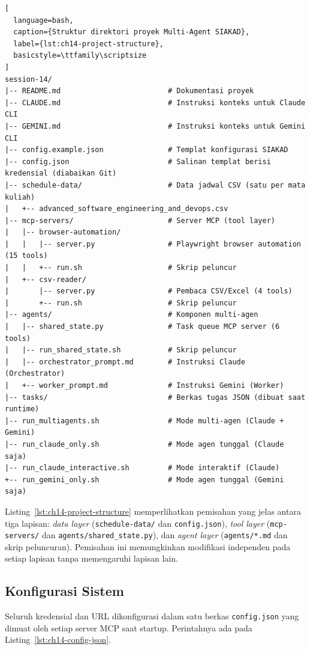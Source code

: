 \begin{lstlisting}[
  language=bash,
  caption={Struktur direktori proyek Multi-Agent SIAKAD},
  label={lst:ch14-project-structure},
  basicstyle=\ttfamily\scriptsize
]
session-14/
|-- README.md                         # Dokumentasi proyek
|-- CLAUDE.md                         # Instruksi konteks untuk Claude CLI
|-- GEMINI.md                         # Instruksi konteks untuk Gemini CLI
|-- config.example.json               # Templat konfigurasi SIAKAD
|-- config.json                       # Salinan templat berisi kredensial (diabaikan Git)
|-- schedule-data/                    # Data jadwal CSV (satu per mata kuliah)
|   +-- advanced_software_engineering_and_devops.csv
|-- mcp-servers/                      # Server MCP (tool layer)
|   |-- browser-automation/
|   |   |-- server.py                 # Playwright browser automation (15 tools)
|   |   +-- run.sh                    # Skrip peluncur
|   +-- csv-reader/
|       |-- server.py                 # Pembaca CSV/Excel (4 tools)
|       +-- run.sh                    # Skrip peluncur
|-- agents/                           # Komponen multi-agen
|   |-- shared_state.py               # Task queue MCP server (6 tools)
|   |-- run_shared_state.sh           # Skrip peluncur
|   |-- orchestrator_prompt.md        # Instruksi Claude (Orchestrator)
|   +-- worker_prompt.md              # Instruksi Gemini (Worker)
|-- tasks/                            # Berkas tugas JSON (dibuat saat runtime)
|-- run_multiagents.sh                # Mode multi-agen (Claude + Gemini)
|-- run_claude_only.sh                # Mode agen tunggal (Claude saja)
|-- run_claude_interactive.sh         # Mode interaktif (Claude)
+-- run_gemini_only.sh                # Mode agen tunggal (Gemini saja)
\end{lstlisting}

\noindent Listing~\ref{lst:ch14-project-structure} memperlihatkan pemisahan yang jelas antara tiga lapisan: \textit{data layer} (\texttt{schedule-data/} dan \texttt{config.json}), \textit{tool layer} (\texttt{mcp-servers/} dan \texttt{agents/shared\_state.py}), dan \textit{agent layer} (\texttt{agents/*.md} dan skrip peluncuran). Pemisahan ini memungkinkan modifikasi independen pada setiap lapisan tanpa memengaruhi lapisan lain.

\subsection{Konfigurasi Sistem}

Seluruh kredensial dan URL dikonfigurasi dalam satu berkas \texttt{config.json} yang dimuat oleh setiap server MCP saat startup. Perintahnya ada pada Listing~\ref{lst:ch14-config-json}.

